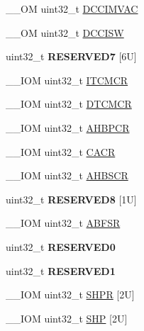 \begin{DoxyCompactItemize}
\+\_\+\+\_\+\+OM uint32\+\_\+t \mbox{\hyperlink{struct_s_c_b___type_a18ef4bf4fbbb205544985598b1bb64f4}{D\+C\+C\+I\+M\+V\+AC}}
\item 
\+\_\+\+\_\+\+OM uint32\+\_\+t \mbox{\hyperlink{struct_s_c_b___type_ab6e447723358e736a9f69ffc88a97ba1}{D\+C\+C\+I\+SW}}
\item 
\mbox{\label{struct_s_c_b___type_a673086408889531c2e8220a306411a43}} 
uint32\+\_\+t {\bfseries R\+E\+S\+E\+R\+V\+E\+D7} \mbox{[}6\+U\mbox{]}
\item 
\+\_\+\+\_\+\+I\+OM uint32\+\_\+t \mbox{\hyperlink{struct_s_c_b___type_a18d1734811b40e7edf6e5213bf336ca8}{I\+T\+C\+M\+CR}}
\item 
\+\_\+\+\_\+\+I\+OM uint32\+\_\+t \mbox{\hyperlink{struct_s_c_b___type_ad5a9c8098433fa3ac108487e0ccd9cfc}{D\+T\+C\+M\+CR}}
\item 
\+\_\+\+\_\+\+I\+OM uint32\+\_\+t \mbox{\hyperlink{struct_s_c_b___type_a209b4026c2994d0e18e883aa9af5c3cc}{A\+H\+B\+P\+CR}}
\item 
\+\_\+\+\_\+\+I\+OM uint32\+\_\+t \mbox{\hyperlink{struct_s_c_b___type_a39711bf09810b078ac81b2c76c6908f6}{C\+A\+CR}}
\item 
\+\_\+\+\_\+\+I\+OM uint32\+\_\+t \mbox{\hyperlink{struct_s_c_b___type_a25bb4ac449a4122217e2ca74b9ad4e3e}{A\+H\+B\+S\+CR}}
\item 
\mbox{\label{struct_s_c_b___type_ac51834a471d74e0522dd2734079d57cb}} 
uint32\+\_\+t {\bfseries R\+E\+S\+E\+R\+V\+E\+D8} \mbox{[}1\+U\mbox{]}
\item 
\+\_\+\+\_\+\+I\+OM uint32\+\_\+t \mbox{\hyperlink{struct_s_c_b___type_aa104b9e01b129abe3de43c439916f655}{A\+B\+F\+SR}}
\item 
\mbox{\label{struct_s_c_b___type_af86c61a5d38a4fc9cef942a12744486b}} 
uint32\+\_\+t {\bfseries R\+E\+S\+E\+R\+V\+E\+D0}
\item 
\mbox{\label{struct_s_c_b___type_ac4ac04e673b5b8320d53f7b0947db902}} 
uint32\+\_\+t {\bfseries R\+E\+S\+E\+R\+V\+E\+D1}
\item 
\+\_\+\+\_\+\+I\+OM uint32\+\_\+t \mbox{\hyperlink{struct_s_c_b___type_a67fd6058e3196a723d64df2d22ae6daa}{S\+H\+PR}} \mbox{[}2\+U\mbox{]}
\item 
\+\_\+\+\_\+\+I\+OM uint32\+\_\+t \mbox{\hyperlink{struct_s_c_b___type_a9976ebb49caa4da93e1dad137071b9ee}{S\+HP}} \mbox{[}2\+U\mbox{]}
\end{DoxyCompactItemize}


